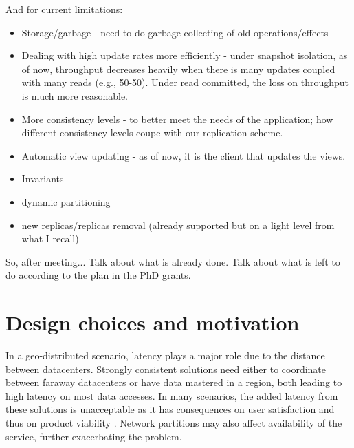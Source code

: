 And for current limitations:
\begin{itemize}
	\item Storage/garbage - need to do garbage collecting of old operations/effects
	\item Dealing with high update rates more efficiently - under snapshot isolation, as of now, throughput decreases heavily when there is many updates coupled with many reads (e.g., 50-50). Under read committed, the loss on throughput is much more reasonable.
	\item More consistency levels - to better meet the needs of the application; how different consistency levels coupe with our replication scheme.
	\item Automatic view updating - as of now, it is the client that updates the views.
	\item Invariants
	\item dynamic partitioning
	\item new replicas/replicas removal (already supported but on a light level from what I recall)
\end{itemize}

So, after meeting...
Talk about what is already done. Talk about what is left to do according to the plan in the PhD grants.

\section{Design choices and motivation}
\label{sec:choices_and_motivation}

In a geo-distributed scenario, latency plays a major role due to the distance between datacenters.
Strongly consistent solutions need either to coordinate between faraway datacenters or have data mastered in a region, both leading to high latency on most data accesses.
In many scenarios, the added latency from these solutions is unacceptable as it has consequences on user satisfaction and thus on product viability \cite{???}. %
Network partitions may also affect availability of the service, further exacerbating the problem.

